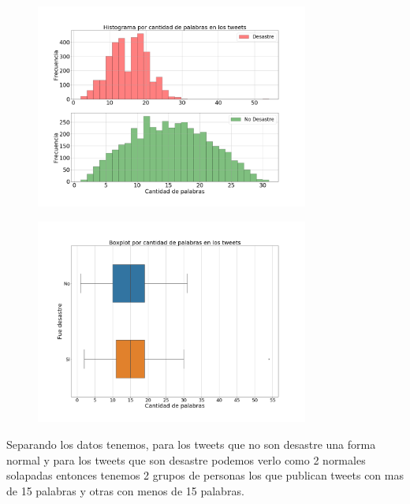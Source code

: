 \documentclass[titlepage,a4paper]{article}
\begin{document}
{\begin{figure}[H]
 \includegraphics[width=0.8\textwidth, height=0.8\textheight, keepaspectratio]{graficos/histograma_palabras_tweets_2.png}
\end{figure}
\begin{figure}[H]
 \centering
 \includegraphics[width=0.8\textwidth, height=0.8\textheight, keepaspectratio]{graficos/histograma_palabras_tweets_3.png}
\end{figure}
Separando los datos tenemos, para los tweets que no son desastre una forma normal y para los tweets que son desastre podemos verlo como 2 normales solapadas entonces tenemos 2 grupos de personas los que publican tweets con mas de 15 palabras y otras con menos de 15 palabras.   
\par}
\end{document}

